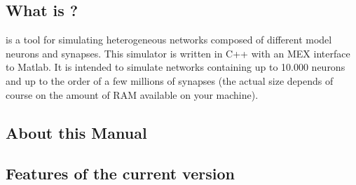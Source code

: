 
\subsection{What is \csim?}

\csim is a tool for simulating heterogeneous networks composed of
different model neurons and synapses. This simulator is written in C++
with an MEX interface to Matlab. It is intended to simulate networks
containing up to 10.000 neurons and up to the order of a few millions
of synapses (the actual size depends of course on the amount of RAM
available on your machine).

\subsection{About this Manual}



\subsection{Features of the current version}

